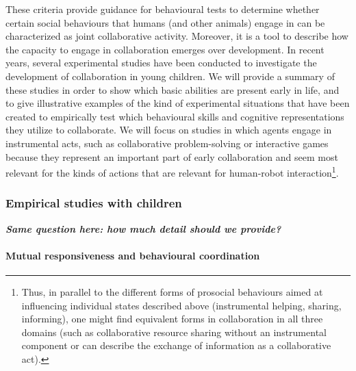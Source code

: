 \documentclass{article}
\begin{document}
These criteria provide guidance for behavioural tests to determine whether
certain social behaviours that humans (and other animals) engage in can be
characterized as joint collaborative activity. Moreover, it is a tool to
describe how the capacity to engage in collaboration emerges over development.
In recent years, several experimental studies have been conducted to
investigate the development of collaboration in young children. We will provide
a summary of these studies in order to show which basic abilities are present
early in life, and to give illustrative examples of the kind of experimental
situations that have been created to empirically test which behavioural skills
and cognitive representations they utilize to collaborate. We will focus on
studies in which agents engage in instrumental acts, such as collaborative
problem-solving or interactive games because they represent an important part
of early collaboration and seem most relevant for the kinds of actions that are
relevant for human-robot interaction\footnote{ Thus, in parallel to the
different forms of prosocial behaviours aimed at influencing individual states
described above (instrumental helping, sharing, informing), one might find
equivalent forms in collaboration in all three domains (such as collaborative
resource sharing without an instrumental component or can describe the exchange
of information as a collaborative act).}. 

\subsubsection{Empirical studies with children}

{\bfseries\itshape
Same question here: how much detail should we provide?}

\paragraph{Mutual responsiveness and behavioural coordination}
\end{document}
